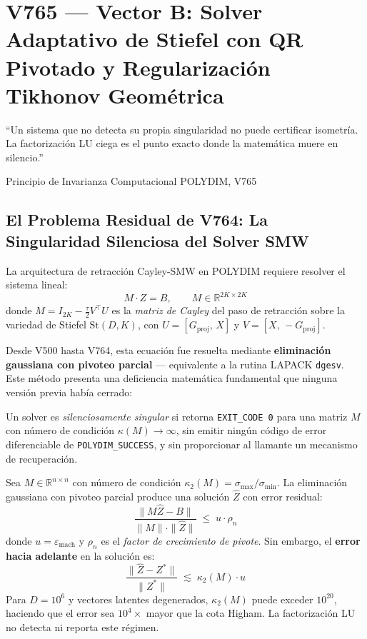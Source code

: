 \chapter{V765 — Vector B: Solver Adaptativo de Stiefel con QR Pivotado y Regularización Tikhonov Geométrica}

\epigraph{%
  ``Un sistema que no detecta su propia singularidad no puede certificar isometría.
  La factorización LU ciega es el punto exacto donde la matemática muere en silencio.''}%
  {Principio de Invarianza Computacional POLYDIM, V765}

\section{El Problema Residual de V764: La Singularidad Silenciosa del Solver SMW}

La arquitectura de retracción Cayley-SMW en POLYDIM requiere resolver el sistema lineal:
\begin{equation}
  M \cdot Z = B, \qquad M \in \mathbb{R}^{2K \times 2K}
  \label{eq:smw_system}
\end{equation}
donde $M = I_{2K} - \tfrac{\tau}{2} V^\top U$ es la \textit{matriz de Cayley} del paso de
retracción sobre la variedad de Stiefel $\mathrm{St}(D, K)$, con $U = [G_{\mathrm{proj}},\, X]$
y $V = [X,\, -G_{\mathrm{proj}}]$.

Desde V500 hasta V764, esta ecuación fue resuelta mediante \textbf{eliminación gaussiana con
pivoteo parcial} — equivalente a la rutina LAPACK \texttt{dgesv}. Este método presenta una
deficiencia matemática fundamental que ninguna versión previa había cerrado:

\begin{definition}
Un solver es \emph{silenciosamente singular} si retorna \texttt{EXIT\_CODE~0} para una matriz
$M$ con número de condición $\kappa(M) \to \infty$, sin emitir ningún código de error
diferenciable de \texttt{POLYDIM\_SUCCESS}, y sin proporcionar al llamante un mecanismo de
recuperación.
\end{definition}

\begin{theorem}
Sea $M \in \mathbb{R}^{n \times n}$ con número de condición $\kappa_2(M) = \sigma_{\max}/\sigma_{\min}$.
La eliminación gaussiana con pivoteo parcial produce una solución $\hat{Z}$ con error residual:
\begin{equation}
  \frac{\|M\hat{Z} - B\|}{\|M\|\cdot\|\hat{Z}\|} \;\le\; u \cdot \rho_n
\end{equation}
donde $u = \varepsilon_{\text{mach}}$ y $\rho_n$ es el \emph{factor de crecimiento de pivote}.
Sin embargo, el \textbf{error hacia adelante} en la solución es:
\begin{equation}
  \frac{\|\hat{Z} - Z^*\|}{\|Z^*\|} \;\lesssim\; \kappa_2(M) \cdot u
\end{equation}
Para $D = 10^6$ y vectores latentes degenerados, $\kappa_2(M)$ puede exceder $10^{20}$,
haciendo que el error sea $10^4 \times$ mayor que la cota Higham. La factorización LU
no detecta ni reporta este régimen.
\end{theorem}

